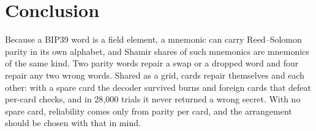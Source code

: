 \documentclass[numeric]{anvil-paper}
\begin{document}
\section{Conclusion}
\label{sec:conclusion}

Because a BIP39 word is a field element, a mnemonic can carry Reed--Solomon
parity in its own alphabet, and Shamir shares of such mnemonics are mnemonics
of the same kind. Two parity words repair a swap or a dropped word and four
repair any two wrong words. Shared as a grid, cards repair themselves and each
other: with a spare card the decoder survived burns and foreign cards that
defeat per-card checks, and in 28{,}000 trials it never returned a wrong
secret. With no spare card, reliability comes only from parity per card, and
the arrangement should be chosen with that in mind.



\end{document}
